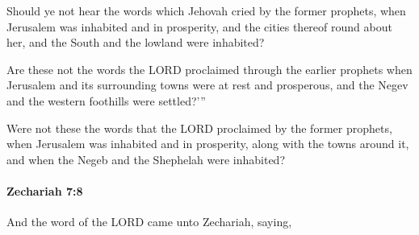 			\begin{versebox}
					\item[BHS] 
					\item[LXX] 
					\item[ASV] Should ye not hear the words which Jehovah cried by the former prophets, when Jerusalem was inhabited and in prosperity, and the cities thereof round about her, and the South and the lowland were inhabited?
					\item[NIV] Are these not the words the LORD proclaimed through the earlier prophets when Jerusalem and its surrounding towns were at rest and prosperous, and the Negev and the western foothills were settled?’”
					\item[NRSV] Were not these the words that the LORD proclaimed by the former prophets, when Jerusalem was inhabited and in prosperity, along with the towns around it, and when the Negeb and the Shephelah were inhabited?
			\end{versebox}

		\paragraph{Zechariah 7:8} %
			\label{ZECHARIAH-7-8}

			And the word of the LORD came unto Zechariah, saying,

